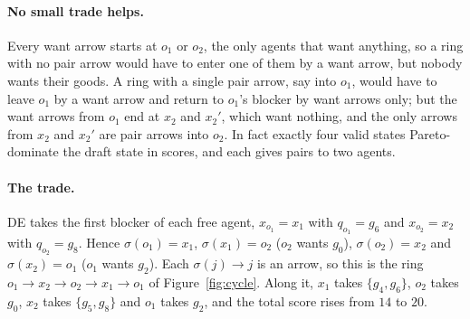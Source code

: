 \documentclass[runningheads,11pt]{llncs}
\newcommand{\DE}{\textup{DE}}
\begin{document}
\paragraph{No small trade helps.} Every want arrow starts at $o_1$ or $o_2$, the only agents that want anything, so a ring with no pair arrow would have to enter one of them by a want arrow, but nobody wants their goods. A ring with a single pair arrow, say into $o_1$, would have to leave $o_1$ by a want arrow and return to $o_1$'s blocker by want arrows only; but the want arrows from $o_1$ end at $x_2$ and $x_2'$, which want nothing, and the only arrows from $x_2$ and $x_2'$ are pair arrows into $o_2$. In fact exactly four valid states Pareto-dominate the draft state in scores, and each gives pairs to two agents.

\paragraph{The trade.} \DE{} takes the first blocker of each free agent, $x_{o_1}=x_1$ with $q_{o_1}=g_6$ and $x_{o_2}=x_2$ with $q_{o_2}=g_8$. Hence $\sigma(o_1)=x_1$, $\sigma(x_1)=o_2$ ($o_2$ wants $g_0$), $\sigma(o_2)=x_2$ and $\sigma(x_2)=o_1$ ($o_1$ wants $g_2$). Each $\sigma(j)\to j$ is an arrow, so this is the ring $o_1\to x_2\to o_2\to x_1\to o_1$ of Figure~\ref{fig:cycle}. Along it, $x_1$ takes $\{g_4,g_6\}$, $o_2$ takes $g_0$, $x_2$ takes $\{g_5,g_8\}$ and $o_1$ takes $g_2$, and the total score rises from $14$ to $20$.
\end{document}
